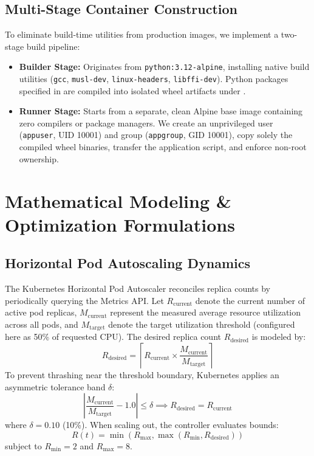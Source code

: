 \documentclass[conference]{IEEEtran}
\begin{document}
\subsection{Multi-Stage Container Construction}
To eliminate build-time utilities from production images, we implement a two-stage build pipeline:
\begin{itemize}
    \item \textbf{Builder Stage:} Originates from \texttt{python:3.12-alpine}, installing native build utilities (\texttt{gcc}, \texttt{musl-dev}, \texttt{linux-headers}, \texttt{libffi-dev}). Python packages specified in  are compiled into isolated wheel artifacts under .
    \item \textbf{Runner Stage:} Starts from a separate, clean Alpine base image containing zero compilers or package managers. We create an unprivileged user (\texttt{appuser}, UID 10001) and group (\texttt{appgroup}, GID 10001), copy solely the compiled wheel binaries, transfer the application script, and enforce non-root ownership.
\end{itemize}

\section{Mathematical Modeling \& Optimization Formulations}

\subsection{Horizontal Pod Autoscaling Dynamics}
The Kubernetes Horizontal Pod Autoscaler reconciles replica counts by periodically querying the Metrics API. Let $R_{\text{current}}$ denote the current number of active pod replicas, $M_{\text{current}}$ represent the measured average resource utilization across all pods, and $M_{\text{target}}$ denote the target utilization threshold (configured here as 50\% of requested CPU). The desired replica count $R_{\text{desired}}$ is modeled by:
\begin{equation}
R_{\text{desired}} = \left\lceil R_{\text{current}} \times \frac{M_{\text{current}}}{M_{\text{target}}} \right\rceil
\label{eq:hpa_raw}
\end{equation}
To prevent thrashing near the threshold boundary, Kubernetes applies an asymmetric tolerance band $\delta$:
\begin{equation}
\left| \frac{M_{\text{current}}}{M_{\text{target}}} - 1.0 \right| \le \delta \implies R_{\text{desired}} = R_{\text{current}}
\end{equation}
where $\delta = 0.10$ (10\%). When scaling out, the controller evaluates bounds:
\begin{equation}
R(t) = \min\left(R_{\text{max}}, \max\left(R_{\text{min}}, R_{\text{desired}}\right)\right)
\end{equation}
subject to $R_{\text{min}} = 2$ and $R_{\text{max}} = 8$.
\end{document}
